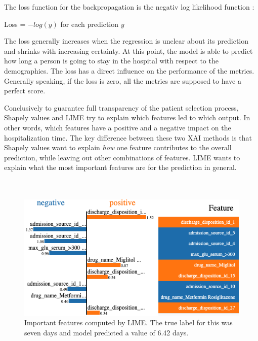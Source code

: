 \documentclass[journal]{IEEEtran}
\begin{document}
The loss function for the backpropagation is the negativ log likelihood function \cite{log}: 

\begin{center}
	Loss = \(-log(y)\) for each prediction \(y\) \\
\end{center}

The loss generally increases when the regression is unclear about its prediction and shrinks with increasing certainty. At this point, the model is able to predict how long a person is going to stay in the hospital with respect to the demographics. The loss has a direct influence on the performance of the metrics. Generally speaking, if the loss is zero, all the metrics are supposed to have a perfect score.

Conclusively to guarantee full transparency of the patient selection process, Shapely values and LIME try to explain which features led to which output. In other words, which features have a positive and a negative impact on the hospitalization time. The key difference between these two XAI methods is that Shapely values want to explain \textit{how} one feature contributes to the overall prediction, while leaving out other combinations of features. LIME wants to explain what the most important features are for the prediction in general. \\ \\ \\

\begin{figure}[!b]
	\centering
	\includegraphics[width=1\linewidth]{../imgs/lime_paper}
	\caption{Important features computed by LIME. The true label for this was seven days and model predicted a value of 6.42 days.}
	\label{fig:lime}
\end{figure}
\end{document}
